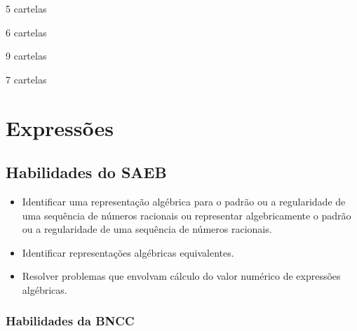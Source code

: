 \begin{escolha}
\item 5 cartelas
\item 6 cartelas
\item 9 cartelas
\item 7 cartelas
\end{escolha}



\chapter{Expressões}

\section{Habilidades do SAEB }
\begin{itemize}
\item Identificar uma representação algébrica para o
padrão ou a regularidade de uma sequência de números racionais ou
representar algebricamente o padrão ou a regularidade de uma sequência
de números racionais.
\item
  Identificar representações algébricas equivalentes.
\item
  Resolver problemas que envolvam cálculo do valor numérico de
  expressões algébricas.
\end{itemize}

\subsection{Habilidades da BNCC}

